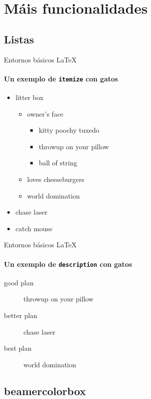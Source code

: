 \documentclass[11pt,aspectratio=169]{beamer}
\begin{document}
\section{Máis funcionalidades}

\subsection*{Listas}

\begin{frame}{Entornos básicos \LaTeX}
\framesubtitle{Un exemplo de \texttt{itemize} con gatos}

\begin{itemize}
 \item litter box
    \begin{itemize}
    \item owner's face
      \begin{itemize}
      \item kitty poochy tuxedo
      \item throwup on your pillow
      \item ball of string
      \end{itemize}
    \item loves cheeseburgers
    \item world domination
    \end{itemize}
 \item chase laser
 \item catch mouse
\end{itemize}

\end{frame}


\begin{frame}{Entornos básicos \LaTeX}
\framesubtitle{Un exemplo de \texttt{description} con gatos}

\begin{description}
 \item[good plan] throwup on your pillow
 \item[better plan] chase laser
 \item[best plan] world domination
\end{description}

\end{frame}

\subsection*{beamercolorbox}
\end{document}
